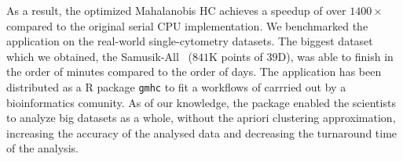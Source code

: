 As a result, the optimized Mahalanobis HC achieves a speedup of over $1400\times$ compared to the original serial CPU implementation. We benchmarked the application on the real-world single-cytometry datasets. The biggest dataset which we obtained, the Samusik-All~\cite{flowrepo} ($841$K points of $39$D), was able to finish in the order of minutes compared to the order of days. The application has been distributed as a R package \texttt{gmhc} to fit a workflows of carrried out by a bioinformatics comunity. As of our knowledge, the package enabled the scientists to analyze big datasets as a whole, without the apriori clustering approximation, increasing the accuracy of the analysed data and decreasing the turnaround time of the analysis.  




